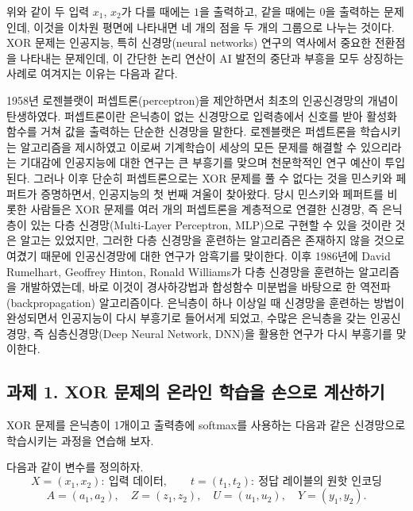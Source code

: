\documentclass[11pt,a4paper]{article}
\begin{document}
위와 같이 두 입력 $x_1$, $x_2$가 다를 때에는 $1$을 출력하고, 같을 때에는 $0$을 출력하는 문제인데,
이것을 이차원 평면에 나타내면 네 개의 점을 두 개의 그룹으로 나누는 것이다.
XOR 문제는 인공지능, 특히 신경망(neural networks) 연구의 역사에서 중요한 전환점을 나타내는 문제인데,
이 간단한 논리 연산이 AI 발전의 중단과 부흥을 모두 상징하는 사례로 여겨지는 이유는 다음과 같다.

1958년 로젠블랫이 퍼셉트론(perceptron)을 제안하면서 최초의 인공신경망의 개념이 탄생하였다.
퍼셉트론이란 은닉층이 없는 신경망으로 입력층에서 신호를 받아 활성화 함수를 거쳐 값을 출력하는 단순한 신경망을 말한다.
로젠블랫은 퍼셉트론을 학습시키는 알고리즘을 제시하였고
이로써 기계학습이 세상의 모든 문제를 해결할 수 있으리라는 기대감에
인공지능에 대한 연구는 큰 부흥기를 맞으며 천문학적인 연구 예산이 투입된다.
그러나 이후 단순히 퍼셉트론으로는 XOR 문제를 풀 수 없다는 것을 민스키와 페퍼트가 증명하면서,
인공지능의 첫 번째 겨울이 찾아왔다.
당시 민스키와 페퍼트를 비롯한 사람들은 XOR 문제를 여러 개의 퍼셉트론을 계층적으로 연결한 신경망,
즉 은닉층이 있는 다층 신경망(Multi-Layer Perceptron, MLP)으로 구현할 수 있을 것이란 것은 알고는 있었지만,
그러한 다층 신경망을 훈련하는 알고리즘은 존재하지 않을 것으로 여겼기 때문에
인공신경망에 대한 연구가 암흑기를 맞이한다.
이후 1986년에 David Rumelhart, Geoffrey Hinton, Ronald Williams가 다층 신경망을 훈련하는 알고리즘을 개발하였는데,
바로 이것이 경사하강법과 합성함수 미분법을 바탕으로 한 역전파(backpropagation) 알고리즘이다.
은닉층이 하나 이상일 때 신경망을 훈련하는 방법이 완성되면서 인공지능이 다시 부흥기로 들어서게 되었고,
수많은 은닉층을 갖는 인공신경망, 즉 심층신경망(Deep Neural Network, DNN)을 활용한 연구가 다시 부흥기를 맞이한다.

\subsection*{과제 1. XOR 문제의 온라인 학습을 손으로 계산하기}

XOR 문제를 은닉층이 1개이고 출력층에 softmax를 사용하는 다음과 같은 신경망으로 학습시키는 과정을 연습해 보자.

다음과 같이 변수를 정의하자.
\[
X=(x_1,x_2):\ \text{입력 데이터},
\qquad
t=(t_1,t_2):\ \text{정답 레이블의 원핫 인코딩}
\]
\[
A=(a_1,a_2),\quad Z=(z_1,z_2),\quad U=(u_1,u_2),\quad Y=(y_1,y_2).
\]
\end{document}
